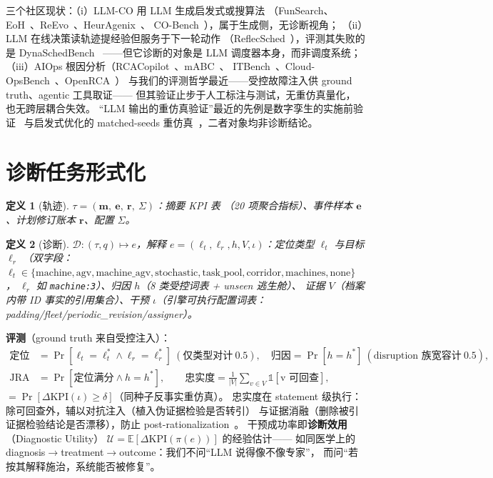 \documentclass[UTF8,12pt,a4paper]{ctexart}
\newtheorem{definition}{定义}
\begin{document}
三个社区现状：（i）LLM-CO 用 LLM 生成启发式或搜算法
（FunSearch、EoH~\cite{eoh2024}、ReEvo~\cite{reevo2024}、HeurAgenix~\cite{heuragenix2025}、
CO-Bench~\cite{cobench2026}），属于生成侧，无诊断视角；
（ii）LLM 在线决策读轨迹提经验但服务于下一轮动作
（ReflecSched~\cite{reflecsched2025}），评测其失败的是 DynaSchedBench~\cite{dynaschedbench2026}
——但它诊断的对象是 LLM 调度器本身，而非调度系统；
（iii）AIOps 根因分析（RCACopilot~\cite{rcacopilot2023}、mABC~\cite{mabc2024}、
ITBench~\cite{itbench2025}、Cloud-OpsBench~\cite{cloudopsbench2026}、OpenRCA~\cite{openrca2_2026}）
与我们的评测哲学最近——受控故障注入供 ground truth、agentic 工具取证——
但其验证止步于人工标注与测试，无重仿真量化，也无跨层耦合失效。
``LLM 输出的重仿真验证''最近的先例是数字孪生的实施前验证~\cite{llmdt2025}
与启发式优化的 matched-seeds 重仿真~\cite{llmheur2026}，二者对象均非诊断结论。

\section{诊断任务形式化}\label{sec:form}

\begin{definition}[轨迹]
$\tau = (\mathbf{m},\ \mathbf{e},\ \mathbf{r},\ \Sigma)$：摘要 KPI 表
（20 项聚合指标）、事件样本 $\mathbf{e}$、计划修订账本 $\mathbf{r}$、配置 $\Sigma$。
\end{definition}

\begin{definition}[诊断]
$\mathcal{D}: (\tau, q) \mapsto e$，解释
$e=(\ell_t,\ell_r,h,V,\iota)$：定位类型 $\ell_t$ 与目标 $\ell_r$
（双字段：$\ell_t\in\{\text{machine},\text{agv},\text{machine\_agv},\text{stochastic},
\text{task\_pool},\text{corridor},\text{machines},\text{none}\}$，
$\ell_r$ 如 \texttt{machine:3}）、归因 $h$（8 类受控词表 + unseen 逃生舱）、
证据 $V$（档案内带 ID 事实的引用集合）、干预 $\iota$（引擎可执行配置词表：
padding/fleet/periodic\_revision/assigner）。
\end{definition}

\textbf{评测}（ground truth 来自受控注入）：
\begin{align}
\text{定位} &= \Pr[\ell_t{=}\ell_t^* \wedge \ell_r{=}\ell_r^*] \ (\text{仅类型对计}\ 0.5), \quad
\text{归因} = \Pr[h = h^*]\ (\text{disruption 族宽容计}\ 0.5),\\
\text{JRA} &= \Pr[\text{定位满分} \wedge h{=}h^*], \qquad
\text{忠实度} = \tfrac{1}{|V|}\sum_{v\in V}\mathbb{1}[\text{v 可回查}],
\end{align}
 $=\Pr[\Delta\mathrm{KPI}(\iota)\ge\delta]$（同种子反事实重仿真）。
忠实度在 statement 级执行：除可回查外，辅以对抗注入（植入伪证据检验是否转引）
与证据消融（删除被引证据检验结论是否漂移），防止 post-rationalization~\cite{cnotf2024}。
干预成功率即\textbf{诊断效用}（Diagnostic Utility）
$\mathcal{U}=\mathbb{E}[\Delta\mathrm{KPI}(\pi(e))]$ 的经验估计——
如同医学上的 diagnosis$\to$treatment$\to$outcome：我们不问``LLM 说得像不像专家''，
而问``若按其解释施治，系统能否被修复''。
\end{document}
